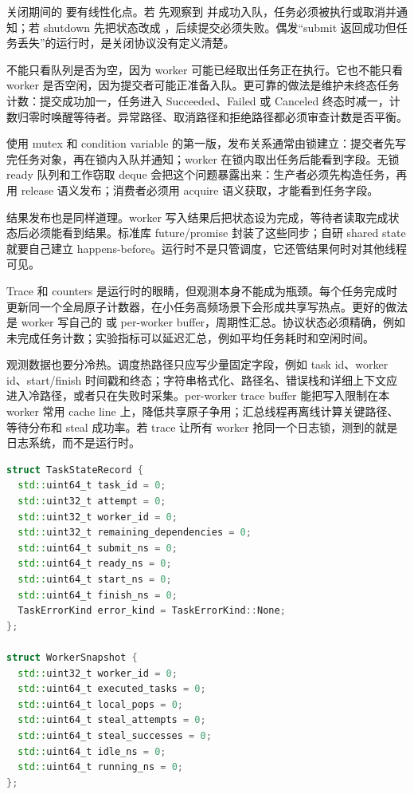 关闭期间的  要有线性化点。若  先观察到  并成功入队，任务必须被执行或取消并通知；若 shutdown 先把状态改成 ，后续提交必须失败。偶发“submit 返回成功但任务丢失”的运行时，是关闭协议没有定义清楚。

 不能只看队列是否为空，因为 worker 可能已经取出任务正在执行。它也不能只看 worker 是否空闲，因为提交者可能正准备入队。更可靠的做法是维护未终态任务计数：提交成功加一，任务进入 Succeeded、Failed 或 Canceled 终态时减一，计数归零时唤醒等待者。异常路径、取消路径和拒绝路径都必须审查计数是否平衡。

使用 mutex 和 condition variable 的第一版，发布关系通常由锁建立：提交者先写完任务对象，再在锁内入队并通知；worker 在锁内取出任务后能看到字段。无锁 ready 队列和工作窃取 deque 会把这个问题暴露出来：生产者必须先构造任务，再用 release 语义发布；消费者必须用 acquire 语义获取，才能看到任务字段。

结果发布也是同样道理。worker 写入结果后把状态设为完成，等待者读取完成状态后必须能看到结果。标准库 future/promise 封装了这些同步；自研 shared state 就要自己建立 happens-before。运行时不是只管调度，它还管结果何时对其他线程可见。

Trace 和 counters 是运行时的眼睛，但观测本身不能成为瓶颈。每个任务完成时更新同一个全局原子计数器，在小任务高频场景下会形成共享写热点。更好的做法是 worker 写自己的  或 per-worker buffer，周期性汇总。协议状态必须精确，例如未完成任务计数；实验指标可以延迟汇总，例如平均任务耗时和空闲时间。

观测数据也要分冷热。调度热路径只应写少量固定字段，例如 task id、worker id、start/finish 时间戳和终态；字符串格式化、路径名、错误栈和详细上下文应进入冷路径，或者只在失败时采集。per-worker trace buffer 能把写入限制在本 worker 常用 cache line 上，降低共享原子争用；汇总线程再离线计算关键路径、等待分布和 steal 成功率。若 trace 让所有 worker 抢同一个日志锁，测到的就是日志系统，而不是运行时。

\begin{lstlisting}[language=C++,caption={运行时 trace 和 worker 指标的示例形态}]
struct TaskStateRecord {
  std::uint64_t task_id = 0;
  std::uint32_t attempt = 0;
  std::uint32_t worker_id = 0;
  std::uint32_t remaining_dependencies = 0;
  std::uint64_t submit_ns = 0;
  std::uint64_t ready_ns = 0;
  std::uint64_t start_ns = 0;
  std::uint64_t finish_ns = 0;
  TaskErrorKind error_kind = TaskErrorKind::None;
};

struct WorkerSnapshot {
  std::uint32_t worker_id = 0;
  std::uint64_t executed_tasks = 0;
  std::uint64_t local_pops = 0;
  std::uint64_t steal_attempts = 0;
  std::uint64_t steal_successes = 0;
  std::uint64_t idle_ns = 0;
  std::uint64_t running_ns = 0;
};
\end{lstlisting}

